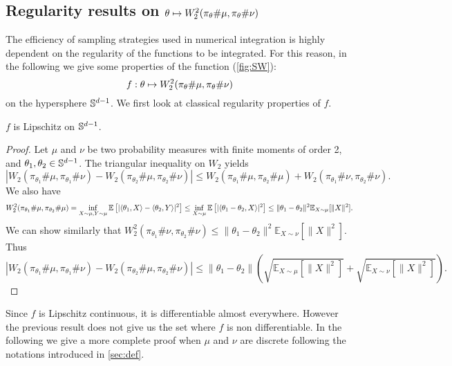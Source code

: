 \subsection{Regularity results on $\theta \mapsto W_2^2(\pi_{\theta} \# \mu, \pi_{\theta} \# \nu)$} \label{sec:regularityProp}
The efficiency of sampling strategies used in numerical integration is
highly dependent on the regularity of the functions to be
integrated. For this reason, in the following we give some properties
of the function {(\autoref{fig:SW}):}
\begin{equation}
f: \theta\mapsto W_2^2(\pi_{\theta} \# \mu, \pi_{\theta} \# \nu)\label{eq:f}
\end{equation}
on the
hypersphere $\mathbb{S}^{d-1}$. 
{We  first look at classical regularity properties of $f$}.

\begin{Prop}
{$f$ is Lipschitz on $\mathbb{S}^{d-1}$. 
}
\end{Prop}
\begin{proof}
{
Let $\mu$ and $\nu$ be two probability measures  with finite moments of order 2, and $\theta_1,\theta_2\in\mathbb{S}^{d-1}$. The triangular inequality on $W_2$ yields
$$\left| W_2(\pi_{\theta_1}\# \mu, \pi_{\theta_1}\# \nu) - W_2(\pi_{\theta_2}\# \mu, \pi_{\theta_2}\# \nu)\right| \leq W_2(\pi_{\theta_1}\# \mu,\pi_{\theta_2}\# \mu) +  W_2(\pi_{\theta_1}\# \nu,\pi_{\theta_2}\# \nu).$$
We also have
\begin{equation*}
W_2^2(\pi_{\theta_1}\# \mu,\pi_{\theta_2}\# \mu)  =  {\inf_{X\sim\mu, Y\sim\mu}\mathbb{E}\left[| \langle \theta_1 , X \rangle - \langle \theta_2, Y \rangle |^2\right]}
 \leq {\inf_{X\sim\mu}\mathbb{E}\left[|\langle \theta_1 - \theta_2, X\rangle |^2\right]}\\
 \leq \|\theta_1 - \theta_2\|^2 {\mathbb{E}_{X\sim\mu}[\|X\|^2]}.
\end{equation*}
We can show similarly that $W_2^2(\pi_{\theta_1}\# \nu,\pi_{\theta_2}\# \nu)\leq \|\theta_1 - \theta_2\|^2 {\mathbb{E}_{X\sim\nu}[\|X\|^2]}$. Thus 
$$\left| W_2(\pi_{\theta_1}\# \mu, \pi_{\theta_1}\# \nu) - W_2(\pi_{\theta_2}\# \mu, \pi_{\theta_2}\# \nu)\right| \leq \|\theta_1 - \theta_2\| \left( \sqrt{\mathbb{E}_{X\sim\mu}[\|X\|^2]}+\sqrt{\mathbb{E}_{X\sim\nu}[\|X\|^2]}\right).$$}
\end{proof}
{Since $f$ is Lipschitz continuous, it is  differentiable almost everywhere.
However the previous result does not give us the set where $f$ is non differentiable. In the following we give a more complete proof when $\mu$ and $\nu$ are discrete following the notations introduced in \autoref{sec:def}.}

